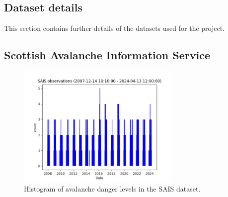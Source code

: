 \documentclass{article}
\newcommand{\sais}{Scottish Avalanche Information Service}
\begin{document}
\newpage
\begin{appendices}
	\section{Dataset details}
	This section contains further details of the datasets used for the project.

	\subsection{\sais}
	
	
	
	\begin{figure}[h]
		\centering
		\includegraphics[width=0.7\textwidth]{sais_observation_histogram.png}
		\caption{Histogram of avalanche danger levels in the SAIS dataset.}
		\label{fig:sais_observation_histogram}
	\end{figure}

	
	
	
	
	
	


\end{appendices}
\end{document}
